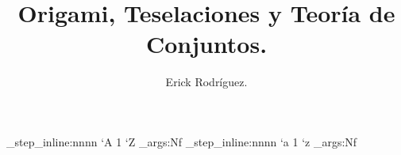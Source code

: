 
\title{Origami, Teselaciones y Teoría de Conjuntos.}
\author{Erick Rodríguez.}
\date{}

\usepackage{amsfonts}
\usepackage{amsmath}
\usepackage{amssymb}
\usepackage{tikz}
\usepackage{mathrsfs}
\usepackage{graphicx}

\usepackage{fontspec}
\setmainfont[
  BoldFont       = bodonibi,
	ItalicFont     = Century modern italic2.ttf,
	BoldItalicFont = bodonibi,
	SmallCapsFont  = lmromancaps10-regular.otf
]{Century_modern.ttf}
\ExplSyntaxOn
\int_step_inline:nnnn { `A } { 1 } { `Z }
 {  \exp_args:Nf  }
\int_step_inline:nnnn { `a } { 1 } { `z } {  \exp_args:Nf }
\ExplSyntaxOff

\newcommand{\dis}{\displaystyle}
\renewcommand{\qed}{\hspace{0.5cm}\rule{0.16cm}{0.4cm}}
\newcommand\Myref[1]{
  \begingroup
  \usebeamerfont*{item projected}%
  \usebeamercolor[bg]{item projected}%
  \begin{pgfpicture}{-1ex}{0ex}{1ex}{2ex}
    \pgfpathcircle{\pgfpoint{0pt}{.75ex}}{1.2ex}
    \pgfusepath{fill}
    \pgftext[base]{\color{fg}\ref{#1}}
  \end{pgfpicture}%
  \endgroup
}
\newcommand{\operator}[1]{\mathop{\vphantom{\sum}\mathchoice
{\vcenter{\hbox{\huge $#1$}}}
{\vcenter{\hbox{\Large $#1$}}}{#1}{#1}}\displaylimits}
\newcommand{\suma}{\operator{\texttt{[image: IMAGENES/Sigma.png]}}}
\setlength{\parindent}{0mm}

